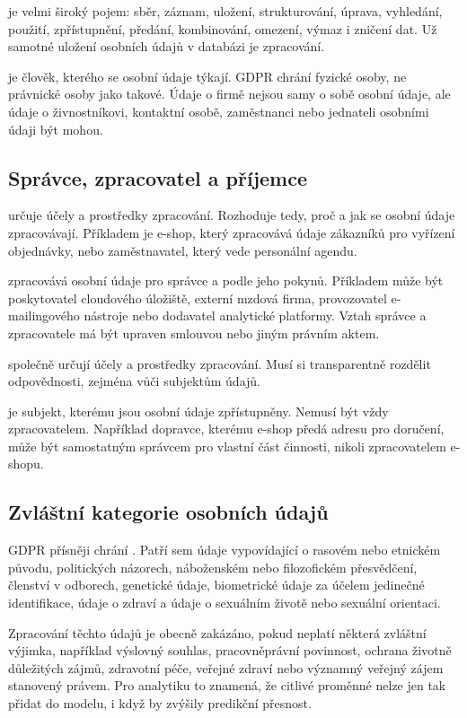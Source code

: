  je velmi široký pojem: sběr, záznam, uložení, strukturování, úprava, vyhledání,
použití, zpřístupnění, předání, kombinování, omezení, výmaz i zničení dat. Už samotné uložení osobních
údajů v databázi je zpracování.

 je člověk, kterého se osobní údaje týkají. GDPR chrání fyzické osoby, ne právnické
osoby jako takové. Údaje o firmě nejsou samy o sobě osobní údaje, ale údaje o živnostníkovi, kontaktní
osobě, zaměstnanci nebo jednateli osobními údaji být mohou.

\subsection{Správce, zpracovatel a příjemce}
 určuje účely a prostředky zpracování. Rozhoduje tedy, proč a jak se osobní údaje
zpracovávají. Příkladem je e-shop, který zpracovává údaje zákazníků pro vyřízení objednávky, nebo
zaměstnavatel, který vede personální agendu.

 zpracovává osobní údaje pro správce a podle jeho pokynů. Příkladem může být
poskytovatel cloudového úložiště, externí mzdová firma, provozovatel e-mailingového nástroje nebo
dodavatel analytické platformy. Vztah správce a zpracovatele má být upraven smlouvou nebo jiným
právním aktem.

 společně určují účely a prostředky zpracování. Musí si transparentně rozdělit
odpovědnosti, zejména vůči subjektům údajů.

 je subjekt, kterému jsou osobní údaje zpřístupněny. Nemusí být vždy zpracovatelem.
Například dopravce, kterému e-shop předá adresu pro doručení, může být samostatným správcem pro vlastní
část činnosti, nikoli zpracovatelem e-shopu.

\subsection{Zvláštní kategorie osobních údajů}
GDPR přísněji chrání . Patří sem údaje vypovídající o rasovém
nebo etnickém původu, politických názorech, náboženském nebo filozofickém přesvědčení, členství v
odborech, genetické údaje, biometrické údaje za účelem jedinečné identifikace, údaje o zdraví a údaje
o sexuálním životě nebo sexuální orientaci.

Zpracování těchto údajů je obecně zakázáno, pokud neplatí některá zvláštní výjimka, například výslovný
souhlas, pracovněprávní povinnost, ochrana životně důležitých zájmů, zdravotní péče, veřejné zdraví
nebo významný veřejný zájem stanovený právem. Pro analytiku to znamená, že citlivé proměnné nelze
jen tak přidat do modelu, i když by zvýšily predikční přesnost.

